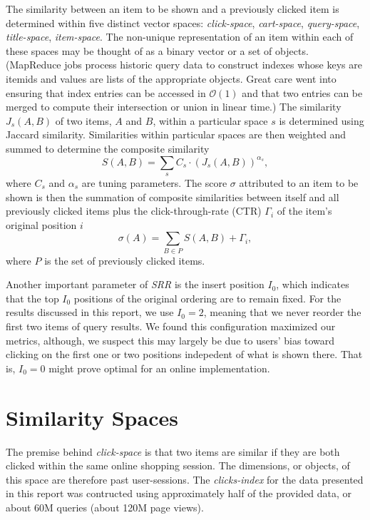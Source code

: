 \documentclass{article}
\begin{document}
The similarity between an item to be shown and a previously clicked item is
determined within five distinct vector spaces: {\em click-space}, {\em
cart-space}, {\em query-space}, {\em title-space}, {\em item-space}. The
non-unique representation of an item within each of these spaces may be thought
of as a binary vector or a set of objects. (MapReduce jobs process historic
query data to construct indexes whose keys are itemids and values are lists of
the appropriate objects. Great care went into ensuring that index entries can be
accessed in $\mathcal{O}(1)$ and that two entries can be merged to compute their
intersection or union in linear time.) The similarity $J_s(A, B)$ of two items,
$A$ and $B$, within a particular space $s$ is determined using Jaccard
similarity. Similarities within particular spaces are then weighted and summed
to determine the composite similarity
\begin{equation}\label{eqn:similarity_metric}
    S(A, B) = \sum_s{C_s\cdot(J_s(A, B))^{\alpha_s}},
\end{equation}
where $C_s$ and $\alpha_s$ are tuning parameters. The score $\sigma$ attributed
to an item to be shown is then the summation of composite similarities between
itself and all previously clicked items plus the click-through-rate (CTR)
$\Gamma_i$ of the item's original position $i$
\begin{equation}\label{eqn:rerank_score}
    \sigma(A) = \sum_{B \in P}{S(A, B)} + \Gamma_i,
\end{equation}
where $P$ is the set of previously clicked items. 

Another important parameter of {\em SRR} is the insert position $I_0$, which
indicates that the top $I_0$ positions of the original ordering are to remain
fixed. For the results discussed in this report, we use $I_0 = 2$, meaning that
we never reorder the first two items of query results. We found this configuration
maximized our metrics, although, we suspect this may largely be due to users'
bias toward clicking on the first one or two positions indepedent of what is
shown there. That is, $I_0 = 0$ might prove optimal for an online implementation.

\section{Similarity Spaces}\label{sec:similarity_spaces}

The premise behind {\em click-space} is that two items are similar if they are
both clicked within the same online shopping session. The dimensions, or
objects, of this space are therefore past user-sessions. The {\em clicks-index}
for the data presented in this report was contructed using approximately half of
the provided data, or about 60M queries (about 120M page views).
\end{document}
